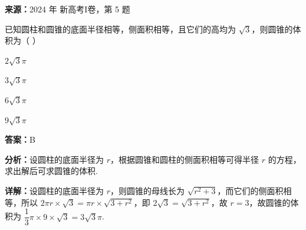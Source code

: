 \begin{question}[points=5]
\textbf{来源：}2024 年 新高考I卷，第 5 题\par
已知圆柱和圆锥的底面半径相等，侧面积相等，且它们的高均为 $\sqrt{3}$，则圆锥的体积为（ ）
\begin{choices}
  \item $2\sqrt{3}\pi$
  \item $3\sqrt{3}\pi$
  \item $6\sqrt{3}\pi$
  \item $9\sqrt{3}\pi$
\end{choices}
\begin{solution}
\textbf{答案：}B

\textbf{分析：}设圆柱的底面半径为 $r$，根据圆锥和圆柱的侧面积相等可得半径 $r$ 的方程，求出解后可求圆锥的体积.

\textbf{详解：}设圆柱的底面半径为 $r$，则圆锥的母线长为 $\sqrt{r^2+3}$，而它们的侧面积相等，所以 $2\pi r\times\sqrt{3}=\pi r\times\sqrt{3+r^2}$，即 $2\sqrt{3}=\sqrt{3+r^2}$，故 $r=3$，故圆锥的体积为 $\dfrac{1}{3}\pi\times 9\times\sqrt{3}=3\sqrt{3}\pi$.
\end{solution}
\end{question}


